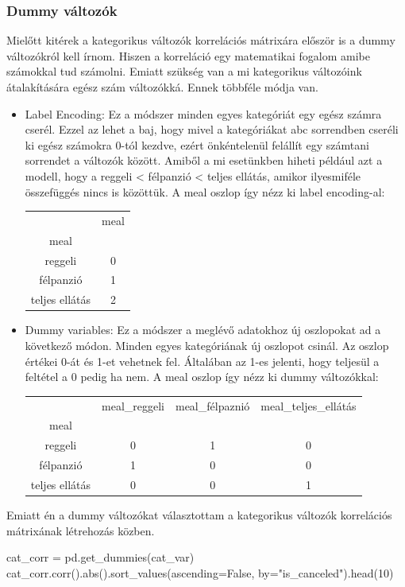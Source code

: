 \subsubsection{Dummy változók}
Mielőtt kitérek a kategorikus változók korrelációs mátrixára először is a dummy változókról kell írnom. Hiszen a korreláció egy matematikai fogalom amibe számokkal tud számolni. Emiatt szükség van a mi kategorikus változóink átalakítására egész szám változókká. Ennek többféle módja van.
\begin{itemize}
    \item Label Encoding: Ez a módszer minden egyes kategóriát egy egész számra cserél. Ezzel az lehet a baj, hogy mivel a kategóriákat abc sorrendben cseréli ki egész számokra 0-tól kezdve, ezért önkéntelenül felállít egy számtani sorrendet a változók között. Amiből a mi esetünkben hiheti például azt a modell, hogy a 
    reggeli < félpanzió < teljes ellátás, amikor ilyesmiféle összefüggés nincs is közöttük. A meal oszlop így nézz ki label encoding-al:
    \begin{tabular}{ c c  }
      & meal \\ 
     meal &  \\  
      reggeli & 0 \\
      félpanzió & 1 \\
      teljes ellátás & 2
    \end{tabular}
    \item Dummy variables: Ez a módszer a meglévő adatokhoz új oszlopokat ad a következő módon. Minden egyes kategóriának új oszlopot csinál. Az oszlop értékei 0-át és 1-et vehetnek fel. Általában az 1-es jelenti, hogy teljesül a feltétel a 0 pedig ha nem. A meal oszlop így nézz ki dummy változókkal:
    
        \begin{tabular}{ c c c c }
          & meal\_reggeli & meal\_félpaznió & meal\_teljes\_ellátás \\ 
         meal &  \\  
          reggeli & 0  & 1 & 0\\
          félpanzió & 1  & 0 & 0\\
          teljes ellátás & 0 & 0 & 1
        \end{tabular}
\end{itemize}

Emiatt én a dummy változókat választottam a kategorikus változók korrelációs mátrixának létrehozás közben.

\begin{python}
cat_corr = pd.get_dummies(cat_var)
cat_corr.corr().abs().sort_values(ascending=False,
    by="is_canceled").head(10)
\end{python}


